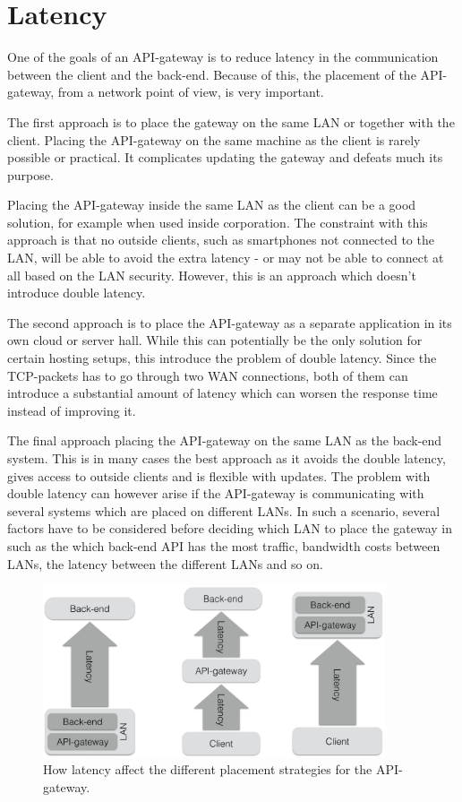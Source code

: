 \documentclass{cslthse-msc}
\begin{document}
\section{Latency}
One of the goals of an API-gateway is to reduce latency in the communication between the client and the back-end. Because of this, the placement of the API-gateway, from a network point of view, is very important. 

The first approach is to place the gateway on the same LAN or together with the client. Placing the API-gateway on the same machine as the client is rarely possible or practical. It complicates updating the gateway and defeats much its purpose. 

Placing the API-gateway inside the same LAN as the client can be a good solution, for example when used inside corporation. The constraint with this approach is that no outside clients, such as smartphones not connected to the LAN, will be able to avoid the extra latency - or may not be able to connect at all based on the LAN security. However, this is an approach which doesn't introduce double latency.

The second approach is to place the API-gateway as a separate application in its own cloud or server hall. While this can potentially be the only solution for certain hosting setups, this introduce the problem of double latency. Since the TCP-packets has to go through two WAN connections, both of them can introduce a substantial amount of latency which can worsen the response time instead of improving it.

The final approach placing the API-gateway on the same LAN as the back-end system. This is in many cases the best approach as it avoids the double latency, gives access to outside clients and is flexible with updates. The problem with double latency can however arise if the API-gateway is communicating with several systems which are placed on different LANs. In such a scenario, several factors have to be considered before deciding which LAN to place the gateway in such as the which back-end API has the most traffic, bandwidth costs between LANs, the latency between the different LANs and so on.

\begin{figure}[H]
  \centering
    \begin{center}
      \includegraphics[width=0.9\textwidth]{images/api_gateway_latency.png}
    \end{center}
  \caption{How latency affect the different placement strategies for the API-gateway.}
\end{figure}
\end{document}
